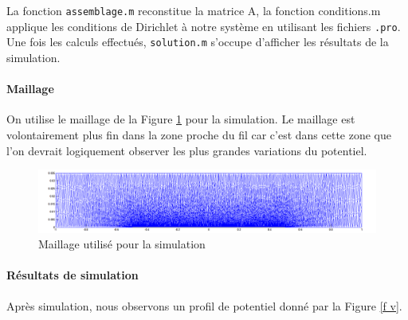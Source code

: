 \documentclass[a4paper,12pt]{article}
\begin{document}
La fonction \verb|assemblage.m| reconstitue la matrice A, la fonction conditions.m applique les conditions de Dirichlet à notre système en utilisant les fichiers \verb|.pro|. Une fois les calculs effectués, \verb|solution.m| s'occupe d'afficher les résultats de la simulation.


\paragraph{Maillage}
On utilise le maillage de la Figure \ref{f mesh} pour la simulation. Le maillage est volontairement plus fin dans la zone proche du fil car c'est dans cette zone que l'on devrait logiquement observer les plus grandes variations du potentiel.
\begin{figure}[h]
\centering
\includegraphics[width=1\textwidth,height=0.25 \textwidth]{images/mesh}
\caption{Maillage utilisé pour la simulation}
\label{f mesh}
\end{figure}

\paragraph{Résultats de simulation}
Après simulation, nous observons un profil de potentiel donné par la Figure \ref{f v}.
\end{document}
